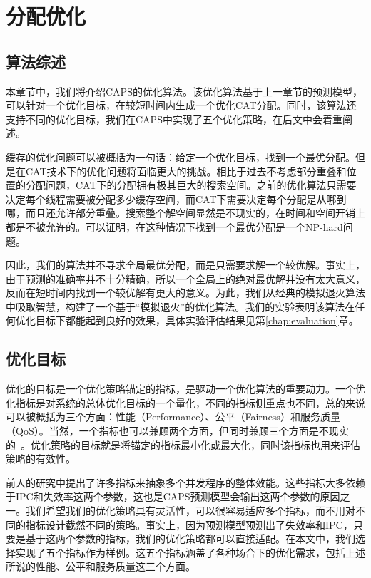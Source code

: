 
\chapter{分配优化} \label{chap:allocation}

\section{算法综述}

本章节中，我们将介绍CAPS的优化算法。该优化算法基于上一章节的预测模型，可以针对一个优化目标，在较短时间内生成一个优化CAT分配。同时，该算法还支持不同的优化目标，我们在CAPS中实现了五个优化策略，在后文中会着重阐述。

缓存的优化问题可以被概括为一句话：给定一个优化目标，找到一个最优分配。但是在CAT技术下的优化问题将面临更大的挑战。相比于过去不考虑部分重叠和位置的分配问题，CAT下的分配拥有极其巨大的搜索空间。之前的优化算法只需要决定每个线程需要被分配多少缓存空间，而CAT下需要决定每个分配是从哪到哪，而且还允许部分重叠。搜索整个解空间显然是不现实的，在时间和空间开销上都是不被允许的。可以证明，在这种情况下找到一个最优分配是一个NP-hard问题。

因此，我们的算法并不寻求全局最优分配，而是只需要求解一个较优解。事实上，由于预测的准确率并不十分精确，所以一个全局上的绝对最优解并没有太大意义，反而在短时间内找到一个较优解有更大的意义。为此，我们从经典的模拟退火算法中吸取智慧，构建了一个基于“模拟退火”的优化算法。我们的实验表明该算法在任何优化目标下都能起到良好的效果，具体实验评估结果见第\ref{chap:evaluation}章。

\section{优化目标}

优化的目标是一个优化策略锚定的指标，是驱动一个优化算法的重要动力。一个优化指标是对系统的总体优化目标的一个量化，不同的指标侧重点也不同，总的来说可以被概括为三个方面：性能（Performance）、公平（Fairness）和服务质量（QoS）。当然，一个指标也可以兼顾两个方面，但同时兼顾三个方面是不现实的~\parencite{hsu2006communist}。优化策略的目标就是将锚定的指标最小化或最大化，同时该指标也用来评估策略的有效性。

前人的研究中提出了许多指标来抽象多个并发程序的整体效能。这些指标大多依赖于IPC和失效率这两个参数，这也是CAPS预测模型会输出这两个参数的原因之一。我们希望我们的优化策略具有灵活性，可以很容易适应多个指标，而不用对不同的指标设计截然不同的策略。事实上，因为预测模型预测出了失效率和IPC，只要是基于这两个参数的指标，我们的优化策略都可以直接适配。在本文中，我们选择实现了五个指标作为样例。这五个指标涵盖了各种场合下的优化需求，包括上述所说的性能、公平和服务质量这三个方面。

